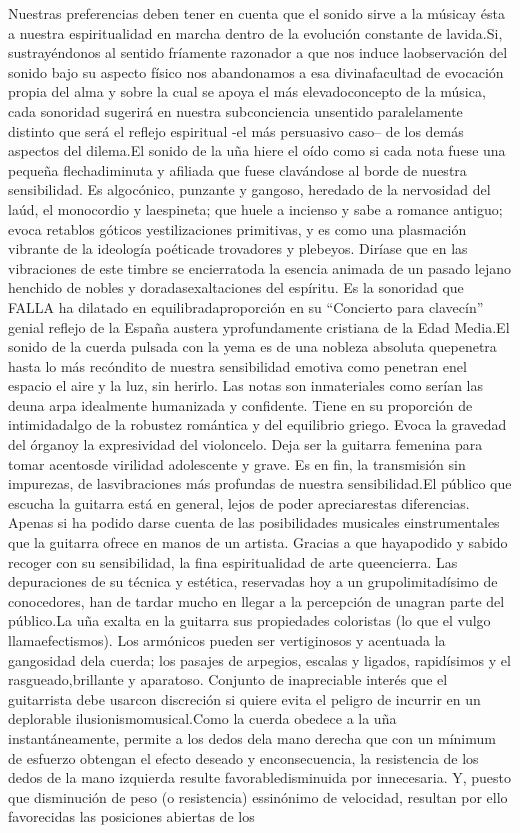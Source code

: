 \documentclass[
11pt, %
a4paper, %
oneside, %
headinclude,footinclude, %
BCOR5mm, %
]{scrartcl}
\begin{document}
{Nuestras preferencias deben tener en cuenta que el sonido sirve a la músicay ésta a nuestra espiritualidad en marcha dentro de la evolución constante de lavida.Si, sustrayéndonos al sentido fríamente razonador a que nos induce laobservación del sonido bajo su aspecto físico nos abandonamos a esa divinafacultad de evocación propia del alma y sobre la cual se apoya el más elevadoconcepto de la música, cada sonoridad sugerirá en nuestra subconciencia unsentido paralelamente distinto que será el reflejo espiritual -el más persuasivo caso– de los demás aspectos del dilema.El sonido de la uña hiere el oído como si cada nota fuese una pequeña flechadiminuta y afiliada que fuese clavándose al borde de nuestra sensibilidad. Es algocónico, punzante y gangoso, heredado de la nervosidad del laúd, el monocordio y laespineta; que huele a incienso y sabe a romance antiguo; evoca retablos góticos yestilizaciones primitivas, y es como una plasmación vibrante de la ideología poéticade trovadores y plebeyos. Diríase que en las vibraciones de este timbre se encierratoda la esencia animada de un pasado lejano henchido de nobles y doradasexaltaciones del espíritu. Es la sonoridad que FALLA ha dilatado en equilibradaproporción en su “Concierto para clavecín” genial reflejo de la España austera yprofundamente cristiana de la Edad Media.El sonido de la cuerda pulsada con la yema es de una nobleza absoluta quepenetra hasta lo más recóndito de nuestra sensibilidad emotiva como penetran enel espacio el aire y la luz, sin herirlo. Las notas son inmateriales como serían las deuna arpa idealmente humanizada y confidente. Tiene en su proporción de intimidadalgo de la robustez romántica y del equilibrio griego. Evoca la gravedad del órganoy la expresividad del violoncelo. Deja ser la guitarra femenina para tomar acentosde virilidad adolescente y grave. Es en fin, la transmisión sin impurezas, de lasvibraciones más profundas de nuestra sensibilidad.El público que escucha la guitarra está en general, lejos de poder apreciarestas diferencias. Apenas si ha podido darse cuenta de las posibilidades musicales einstrumentales que la guitarra ofrece en manos de un artista. Gracias a que hayapodido y sabido recoger con su sensibilidad, la fina espiritualidad de arte queencierra. Las depuraciones de su técnica y estética, reservadas hoy a un grupolimitadísimo de conocedores, han de tardar mucho en llegar a la percepción de unagran parte del público.La uña exalta en la guitarra sus propiedades coloristas (lo que el vulgo llamaefectismos). Los armónicos pueden ser vertiginosos y acentuada la gangosidad dela cuerda; los pasajes de arpegios, escalas y ligados, rapidísimos y el rasgueado,brillante y aparatoso. Conjunto de inapreciable interés que el guitarrista debe usarcon discreción si quiere evita el peligro de incurrir en un deplorable ilusionismomusical.Como la cuerda obedece a la uña instantáneamente, permite a los dedos dela mano derecha que con un mínimum de esfuerzo obtengan el efecto deseado y enconsecuencia, la resistencia de los dedos de la mano izquierda resulte favorabledisminuida por innecesaria. Y, puesto que disminución de peso (o resistencia) essinónimo de velocidad, resultan por ello favorecidas las posiciones abiertas de los  
}
\end{document}
